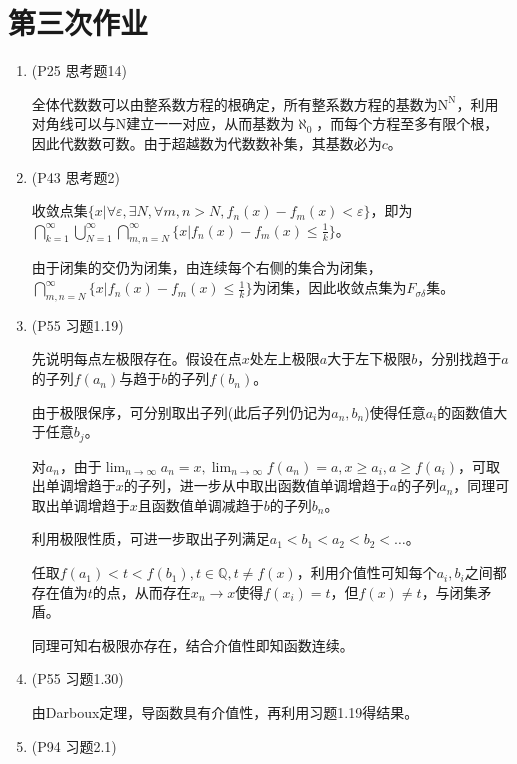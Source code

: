 \documentclass[a4paper,UTF8,fontset=windows]{ctexart}
\begin{document}
\section{第三次作业}
\begin{enumerate}
    \item (P25 思考题14)
    
    全体代数数可以由整系数方程的根确定，所有整系数方程的基数为$\mathrm{N}^\mathrm{N}$，利用对角线可以与$\mathrm{N}$建立一一对应，从而基数为$\aleph_0$，而每个方程至多有限个根，因此代数数可数。由于超越数为代数数补集，其基数必为$c$。
    
    \item (P43 思考题2)
    
    收敛点集$\{x|\forall\varepsilon,\exists N,\forall m,n>N,f_n(x)-f_m(x)<\varepsilon\}$，即为$\displaystyle\bigcap_{k=1}^\infty\bigcup_{N=1}^\infty\bigcap_{m,n=N}^\infty\{x|f_n(x)-f_m(x)\le\frac{1}{k}\}$。
    
    由于闭集的交仍为闭集，由连续每个右侧的集合为闭集，$\displaystyle\bigcap_{m,n=N}^\infty\{x|f_n(x)-f_m(x)\le\frac{1}{k}\}$为闭集，因此收敛点集为$F_{\sigma\delta}$集。
    
    \item (P55 习题1.19)
    
    先说明每点左极限存在。假设在点$x$处左上极限$a$大于左下极限$b$，分别找趋于$a$的子列$f(a_n)$与趋于$b$的子列$f(b_n)$。
    
    由于极限保序，可分别取出子列(此后子列仍记为$a_n,b_n$)使得任意$a_i$的函数值大于任意$b_j$。
    
    对$a_n$，由于$\lim_{n\to\infty}a_n=x,\lim_{n\to\infty}f(a_n)=a,x\ge a_i,a\ge f(a_i)$，可取出单调增趋于$x$的子列，进一步从中取出函数值单调增趋于$a$的子列$a_n$，同理可取出单调增趋于$x$且函数值单调减趋于$b$的子列$b_n$。
    
    利用极限性质，可进一步取出子列满足$a_1<b_1<a_2<b_2<\dots$。
    
    任取$f(a_1)<t<f(b_1),t\in\mathbb{Q},t\ne f(x)$，利用介值性可知每个$a_i,b_i$之间都存在值为$t$的点，从而存在$x_n\to x$使得$f(x_i)=t$，但$f(x)\ne t$，与闭集矛盾。
    
    同理可知右极限亦存在，结合介值性即知函数连续。
    
    \item (P55 习题1.30)
    
    由Darboux定理，导函数具有介值性，再利用习题1.19得结果。
    
    \item (P94 习题2.1)
    

\end{enumerate}
\end{document}
